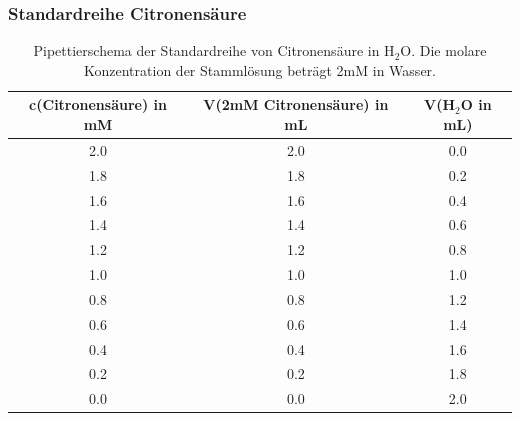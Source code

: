 \documentclass[10pt,a4paper]{article}
\begin{document}
		\subsubsection{Standardreihe Citronensäure}
			\begin{table}[H]
				\centering
				\caption{Pipettierschema der Standardreihe von Citronensäure in H$_2$O. Die molare Konzentration der Stammlösung beträgt 2mM in Wasser.}
				\label{tab:pipettierschema Standardreihe}
				\begin{tabular}{ccc}
					\toprule
					c(Citronensäure) in mM &V(2mM Citronensäure) in mL & V(H$_2$O in mL)\\
					\midrule
					2.0 & 2.0 & 0.0\\
					1.8 & 1.8 & 0.2\\
					1.6 & 1.6 & 0.4 \\
					1.4 & 1.4 & 0.6 \\
					1.2 & 1.2 & 0.8\\
					1.0 & 1.0 & 1.0 \\
					0.8 & 0.8 & 1.2\\
					0.6 & 0.6 & 1.4\\
					0.4 & 0.4 & 1.6 \\
					0.2 & 0.2 & 1.8 \\
					0.0 & 0.0 & 2.0\\
					\bottomrule
				\end{tabular}
			\end{table}	
	
	
	\nocite{*}
	
	\newpage
	
	
\end{document}
